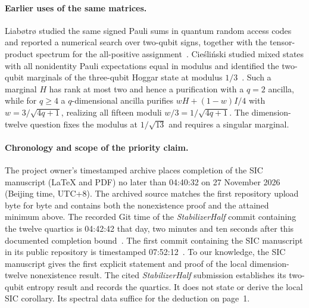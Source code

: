 \documentclass[11pt,a4paper]{article}
\begin{document}
\paragraph{Earlier uses of the same matrices.}
Liab{\o}tr{\o} studied the same signed Pauli sums in quantum random access codes and reported a numerical search over two-qubit signs, together with the tensor-product spectrum for the all-positive assignment~\cite[Eqs.~(75)--(78) and Table~IV]{liabotro}. Cie\'sli\'nski studied mixed states with all nonidentity Pauli expectations equal in modulus and identified the two-qubit marginals of the three-qubit Hoggar state at modulus $1/3$~\cite[Sec.~V]{cieslinski}. Such a marginal $H$ has rank at most two and hence a purification with a $q=2$ ancilla, while for $q\ge4$ a $q$-dimensional ancilla purifies $wH+(1-w)I/4$ with $w=3/\sqrt{4q+1}$, realizing all fifteen moduli $w/3=1/\sqrt{4q+1}$. The dimension-twelve question fixes the modulus at $1/\sqrt{13}$ and requires a singular marginal.

\paragraph{Chronology and scope of the priority claim.}
The project owner's timestamped archive places completion of the SIC manuscript (\LaTeX{} and PDF) no later than 04:40:32 on 27 November 2026 (Beijing time, UTC+8). The archived source matches the first repository upload byte for byte and contains both the nonexistence proof and the attained minimum above. The recorded Git time of the \emph{StabilizerHalf} commit containing the twelve quartics is 04:42:42 that day, two minutes and ten seconds after this documented completion bound~\cite{half}. The first commit containing the SIC manuscript in its public repository is timestamped 07:52:12~\cite{sic}. To our knowledge, the SIC manuscript gives the first explicit statement and proof of the local dimension-twelve nonexistence result. The cited \emph{StabilizerHalf} submission establishes its two-qubit entropy result and records the quartics. It does not state or derive the local SIC corollary. Its spectral data suffice for the deduction on page~1.
\end{document}
